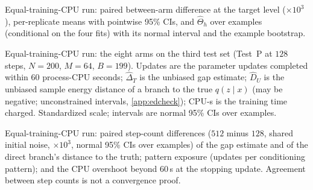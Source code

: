 \documentclass{article}
\theoremstyle{plain}
\theoremstyle{definition}
\theoremstyle{remark}
\begin{document}
\begin{table}[h]
\centering
\caption{Equal-training-CPU run: paired between-arm difference at the target level ($\times10^{3}$), per-replicate means with pointwise 95\% CIs, and $\widehat\Theta_h$ over examples (conditional on the four fits) with its normal interval and the example bootstrap.}
\label{tab:r8theta}
\scriptsize
\setlength{\tabcolsep}{3pt}

\end{table}
\begin{table}[h]
\centering
\caption{Equal-training-CPU run: the eight arms on the third test set (Test~P at $128$ steps, $N=200$, $M=64$, $B=199$). Updates are the parameter updates completed within $60$ process-CPU seconds; $\widehat\Delta_T$ is the unbiased gap estimate; $\widehat D_U$ is the unbiased sample energy distance of a branch to the true $q(z\mid x)$ (may be negative; unconstrained intervals, \cref{app:edcheck}); CPU-s is the training time charged. Standardized scale; intervals are normal 95\% CIs over examples.}
\label{tab:r8reps}
\scriptsize
\setlength{\tabcolsep}{3pt}

\end{table}
\begin{table}[h]
\centering
\caption{Equal-training-CPU run: paired step-count differences ($512$ minus $128$, shared initial noise, $\times10^{3}$, normal 95\% CIs over examples) of the gap estimate and of the direct branch's distance to the truth; pattern exposure (updates per conditioning pattern); and the CPU overshoot beyond $60$\,s at the stopping update. Agreement between step counts is not a convergence proof.}
\label{tab:r8solvercost}
\scriptsize
\setlength{\tabcolsep}{3pt}

\end{table}
\end{document}
